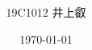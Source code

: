 \documentclass[uplatex, a4paper, 12pt, openany, oneside]{jsbook}
\title{
  \centering
    \scalebox{1.0}{モデル予測制御による二足歩行ロボットの}\\
    \vspace{-0.3zh}
    \scalebox{1.0}{歩行パターン生成手法の実装と公開}
    \vspace{-0.6zh}
}
\date{\today}
\author{19C1012 井上叡}
\begin{document}
\frontmatter{}
%

%
\mainmatter{}
%

%




\backmatter{}
%

%
\end{document}
